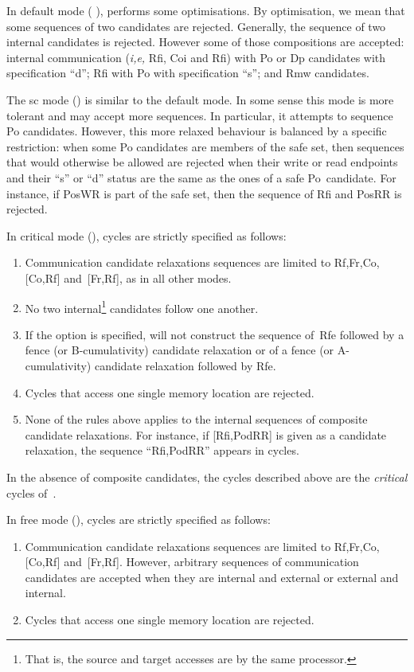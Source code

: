 \label{default:def}In default mode ( ), \diy{} performs some optimisations. By optimisation, we mean that some sequences of two candidates are rejected. Generally, the sequence of  two internal candidates is rejected. However some of those compositions are accepted: internal communication (\emph{i,e,} Rfi, Coi and Rfi) with Po or Dp candidates with specification ``d'';
Rfi with Po with specification ``s''; and Rmw candidates.

\label{sc:def}The sc mode () is similar to the default mode. In some sense this mode is more tolerant and may accept more sequences. In particular, it attempts to sequence Po candidates. However, this more relaxed behaviour is balanced by a specific restriction: when some Po candidates are members of the safe set, then sequences that would otherwise be allowed are rejected when their write or read endpoints and their ``s'' or ``d'' status are the same as  the ones of a safe Po~candidate. For instance, if PosWR is part of the safe set, then the sequence of Rfi and PosRR is rejected.

\label{critical:def}%
In critical mode (),  cycles are strictly specified as
follows:
\begin{enumerate}
\item Communication candidate relaxations sequences are
limited to Rf,Fr,Co,[Co,Rf] and~[Fr,Rf], as in all other modes.
\item No two internal\footnote{That is, the source and target
accesses are by the same processor.} candidates follow one another.
\item If the option  is specified,
\diy{} will not construct
the sequence of~Rfe followed by a fence (or B-cumulativity) candidate
relaxation or
of a fence (or A-cumulativity) candidate relaxation followed by Rfe.
\item Cycles that access one single memory location are rejected.
\item None of the rules above applies to the internal sequences of
composite candidate relaxations. For instance, if [Rfi,PodRR]
is given as a candidate relaxation, the sequence ``Rfi,PodRR'' appears
in cycles.
\end{enumerate}
In the absence of composite candidates,
the cycles described above are the \emph{critical} cycles of~\cite{ss88}.

\label{free:def}%
In free mode (), cycles are strictly specified as
follows:
\begin{enumerate}
\item Communication candidate relaxations sequences are
limited to Rf,Fr,Co,[Co,Rf] and~[Fr,Rf]. However, arbitrary sequences
of communication candidates are accepted when they are internal and external
or external and internal.
\item Cycles that access one single memory location are rejected.
\end{enumerate}


